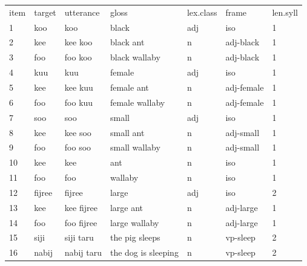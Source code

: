 \documentclass[12pt]{article}
\begin{document}
\begin{table}[!h]
{\small    \begin{tabular}{lllllll}
    item & target & utterance       & gloss                            & lex.class & frame      & len.syll \\
    1    & koo    & koo             & black                            & adj       & iso        & 1        \\
    2    & kee    & kee koo         & black ant                        & n         & adj-black  & 1        \\
    3    & foo    & foo koo         & black wallaby                    & n         & adj-black  & 1        \\
    4    & kuu    & kuu             & female                           & adj       & iso        & 1        \\
    5    & kee    & kee kuu         & female  ant                      & n         & adj-female & 1        \\
    6    & foo    & foo kuu         & female wallaby                   & n         & adj-female & 1        \\
    7    & soo    & soo             & small                            & adj       & iso        & 1        \\
    8    & kee    & kee soo         & small ant                        & n         & adj-small  & 1        \\
    9    & foo    & foo soo         & small wallaby                    & n         & adj-small  & 1        \\
    10   & kee    & kee             & ant                              & n         & iso        & 1        \\
    11   & foo    & foo             & wallaby                          & n         & iso        & 1        \\
    12   & fijree & fijree          & large                            & adj       & iso        & 2        \\
    13   & kee    & kee fijree      & large ant                        & n         & adj-large  & 1        \\
    14   & foo    & foo fijree      & large wallaby                    & n         & adj-large  & 1        \\
    15   & siji   & siji taru       & the pig sleeps                   & n         & vp-sleep   & 2        \\
    16   & nabij  & nabij taru      & the dog is sleeping              & n         & vp-sleep   & 2        \\

\end{tabular}}
\end{table}
\end{document}
